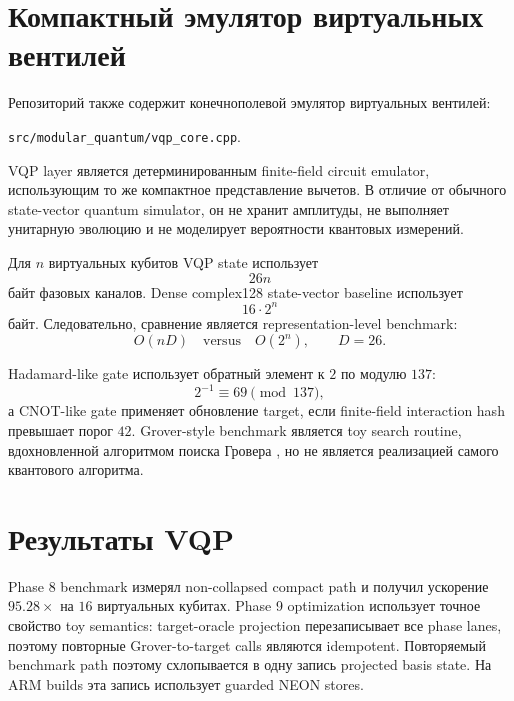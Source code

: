 \documentclass[11pt]{article}
\begin{document}
\section{Компактный эмулятор виртуальных вентилей}

Репозиторий также содержит конечнополевой эмулятор виртуальных вентилей:
\begin{center}
\texttt{src/modular\_quantum/vqp\_core.cpp}.
\end{center}
VQP layer является детерминированным finite-field circuit emulator,
использующим то же компактное представление вычетов. В отличие от обычного
state-vector quantum simulator, он не хранит амплитуды, не выполняет унитарную
эволюцию и не моделирует вероятности квантовых измерений.

Для $n$ виртуальных кубитов VQP state использует
\begin{equation}
    26n
\end{equation}
байт фазовых каналов. Dense complex128 state-vector baseline использует
\begin{equation}
    16\cdot2^n
\end{equation}
байт. Следовательно, сравнение является representation-level benchmark:
\begin{equation}
    O(nD)\quad\mathrm{versus}\quad O(2^n),
    \qquad D=26.
\end{equation}

Hadamard-like gate использует обратный элемент к $2$ по модулю $137$:
\begin{equation}
    2^{-1}\equiv69\pmod{137},
\end{equation}
а CNOT-like gate применяет обновление target, если finite-field interaction hash
превышает порог $42$. Grover-style benchmark является toy search routine,
вдохновленной алгоритмом поиска Гровера \cite{grover1996}, но не является
реализацией самого квантового алгоритма.

\section{Результаты VQP}

Phase 8 benchmark измерял non-collapsed compact path и получил ускорение
$95.28\times$ на $16$ виртуальных кубитах. Phase 9 optimization использует
точное свойство toy semantics: target-oracle projection перезаписывает все
phase lanes, поэтому повторные Grover-to-target calls являются idempotent.
Повторяемый benchmark path поэтому схлопывается в одну запись projected basis
state. На ARM builds эта запись использует guarded NEON stores.
\end{document}
